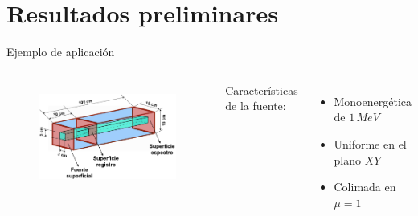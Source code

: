 \documentclass[aspectratio=169,english]{beamer}
\begin{document}
\section{Resultados preliminares}
\begin{frame}{Ejemplo de aplicación}
    

    \begin{columns}
        \begin{figure}
            \centering
            \includegraphics[width=\linewidth]{imagens/croquis1.png}
            \label{fig:croquis1}
        \end{figure}
        
        Características de la fuente:
        \begin{itemize}
            \item Monoenergética de $1 \, MeV$
            \item Uniforme en el plano $XY$
            \item Colimada en $\mu = 1$ 
        \end{itemize}
    \end{columns}

\end{frame}
\end{document}
